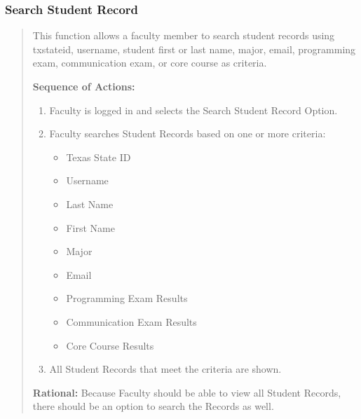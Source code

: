    \subsubsection{Search Student Record} 
   \begin{quote} %
         This function allows a faculty member to search student records
         using txstateid, username, student first or last name, major,
         email, programming exam, communication exam, or core course as
         criteria.
         
         \textbf{Sequence of Actions:}
         \begin{enumerate}
            \item Faculty is logged in and selects the Search Student Record Option.
            \item Faculty searches Student Records based on one or more criteria:
               \begin{itemize}
                  \item Texas State ID
                  \item Username
                  \item Last Name
                  \item First Name
                  \item Major
                  \item Email
                  \item Programming Exam Results
                  \item Communication Exam Results
                  \item Core Course Results
               \end{itemize}
            \item All Student Records that meet the criteria are shown.
      \end{enumerate}

         \textbf{Rational:}
         Because Faculty should be able to view all Student Records, there
         should be an option to search the Records as well.
   \end{quote} %


